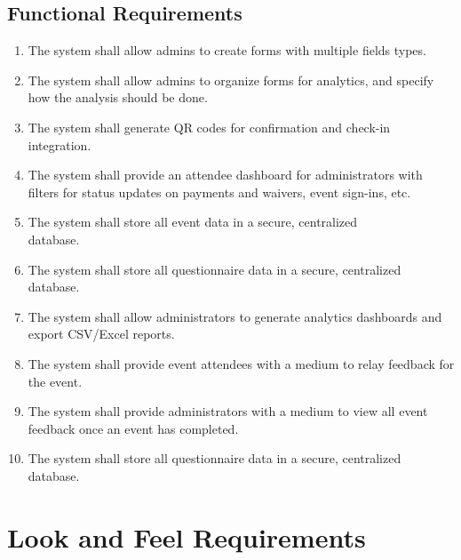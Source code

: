 \documentclass[12pt]{article}
\begin{document}
\subsection{Functional Requirements}
\begin{enumerate}[align=left,
  leftmargin=*,
  labelsep=1em,
  itemindent=0em,
  label=\bfseries FR-\arabic*:]
  \item The system shall allow admins to create forms with multiple fields types.
  \item The system shall allow admins to organize forms for analytics, and specify how
    the analysis should be done.
  \item The system shall generate QR codes for confirmation and check-in integration.
  \item The system shall provide an attendee dashboard for administrators with filters
    for status updates on payments and waivers, event sign-ins, etc.
  \item The system shall store all event data in a secure, centralized\\database.
  \item The system shall store all questionnaire data in a secure, centralized database.
  \item The system shall allow administrators to generate analytics dashboards and export
    CSV/Excel reports.
  \item The system shall provide event attendees with a medium to relay feedback for the
    event.
  \item The system shall provide administrators with a medium to view all event feedback
    once an event has completed.
  \item{The system shall store all questionnaire data in a secure, centralized database.}
\end{enumerate}

\section{Look and Feel Requirements}
\end{document}
